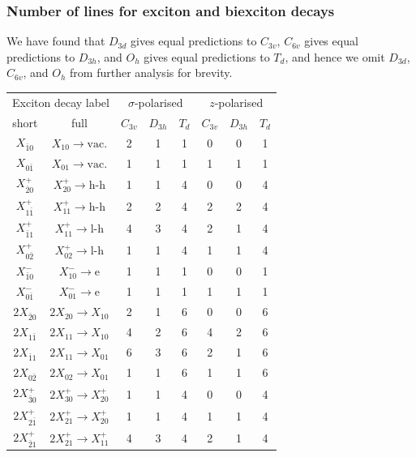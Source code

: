 \subsubsection{Number of lines for exciton and biexciton decays}
We have found that $D_{3d}$ gives equal predictions to $C_{3v}$, $C_{6v}$ gives equal predictions to $D_{3h}$, and $O_h$ gives equal predictions to $T_d$, and hence we omit $D_{3d}$, $C_{6v}$, and $O_h$ from further analysis for brevity.

\begin{table}
\begin{center}
\begin{tabular}{c c | c c c | c c c}
\multicolumn{2}{c}{Exciton decay label} &  \multicolumn{3}{c}{$\sigma$-polarised} & \multicolumn{3}{c}{$z$-polarised}\\
short & full & $C_{3v}$ & $D_{3h}$ & $T_d$ & $C_{3v}$ & $D_{3h}$ & $T_d$ \\\hline
 $X_{\bar{1}0}$ & $X_{10}\to \text{vac.}$ & 2 & 1 & 1 & 0 & 0 & 1\\
 $X_{0\bar{1}}$ & $X_{01}\to \text{vac.}$ & 1 & 1 & 1 & 1 & 1 & 1\\
 $X^+_{\bar{2}0}$ & $X^+_{20}\to \text{h-h}$ & 1 & 1 & 4 & 0 & 0 & 4\\
 $X^+_{1\bar{1}}$ & $X^+_{11}\to \text{h-h}$ & 2 & 2 & 4 & 2 & 2 & 4\\
 $X^+_{\bar{1}1}$ & $X^+_{11}\to \text{l-h}$ & 4 & 3 & 4 & 2 & 1 & 4\\
 $X^+_{0\bar{2}}$ & $X^+_{02}\to \text{l-h}$ & 1 & 1 & 4 & 1 & 1 & 4\\
 $X^-_{\bar{1}0}$ & $X^-_{10}\to \text{e}$ & 1 & 1 & 1 & 0 & 0 & 1\\
 $X^-_{0\bar{1}}$ & $X^-_{01}\to \text{e}$ & 1 & 1 & 1 & 1 & 1 & 1\\
 $2X_{\bar{2}0}$ & $2X_{20}\to X_{10}$ & 2 & 1 & 6 & 0 & 0 & 6\\
 $2X_{1\bar{1}}$ & $2X_{11}\to X_{10}$ & 4 & 2 & 6 & 4 & 2 & 6\\
 $2X_{\bar{1}1}$ & $2X_{11}\to X_{01}$ & 6 & 3 & 6 & 2 & 1 & 6\\
 $2X_{0\bar{2}}$ & $2X_{02}\to X_{01}$ & 1 & 1 & 6 & 1 & 1 & 6\\
 $2X^+_{\bar{3}0}$ & $2X^+_{30}\to X^+_{20}$ & 1 & 1 & 4 & 0 & 0 & 4\\
 $2X^+_{2\bar{1}}$ & $2X^+_{21}\to X^+_{20}$ & 1 & 1 & 4 & 1 & 1 & 4\\
 $2X^+_{\bar{2}1}$ & $2X^+_{21}\to X^+_{11}$ & 4 & 3 & 4 & 2 & 1 & 4\\

\end{tabular}
\end{center}
\end{table}
